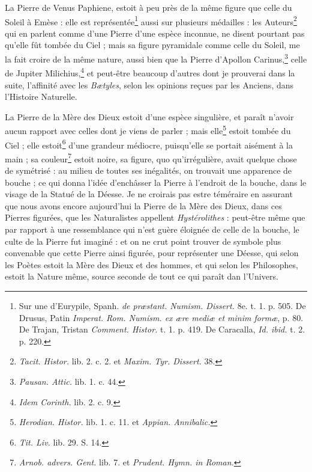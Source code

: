 \documentclass[a4paper, 11pt, oneside, polutonikogreek, french]{article}
\begin{document}
La Pierre de Venus Paphiene, estoit à peu près de la même figure que celle du Soleil à Emèse : elle est représentée\footnote{Sur une d'Eurypile, Spanh. \emph{de præstant. Numism. Dissert.} 8e. t. 1. p. 505. De Drusus, Patin \emph{Imperat. Rom. Numism. ex ære mediæ et minim formæ}, p. 80. De Trajan, Tristan \emph{Comment. Histor.} t. 1. p. 419. De Caracalla, \emph{Id. ibid.} t. 2. p. 220.} aussi sur plusieurs médailles : les Auteurs\footnote{\emph{Tacit. Histor.} lib. 2. c. 2. et \emph{Maxim. Tyr. Dissert.} 38.} qui en parlent comme d'une Pierre d'une espèce inconnue, ne disent pourtant pas qu'elle fût tombée du Ciel ; mais sa figure pyramidale comme celle du Soleil, me la fait croire de la même nature, aussi bien que la Pierre d'Apollon Carinus,\footnote{\emph{Pausan. Attic.} lib. 1. c. 44.} celle de Jupiter Milichius,\footnote{\emph{Idem Corinth.} lib. 2. c. 9.} et peut-être beaucoup d'autres dont je prouverai dans la suite, l'affinité avec les \emph{Bætyles}, selon les opinions reçues par les Anciens, dans l'Histoire Naturelle.

La Pierre de la Mère des Dieux estoit d'une espèce singulière, et paraît n'avoir aucun rapport avec celles dont je viens de parler ; mais elle\footnote{\emph{Herodian. Histor.} lib. 1. c. 11. et \emph{Appian. Annibalic.}} estoit tombée du Ciel ; elle estoit\footnote{\emph{Tit. Liv.} lib. 29. S. 14.} d'une grandeur médiocre, puisqu'elle se portait aisément à la main ; sa couleur\footnote{\emph{Arnob. advers. Gent.} lib. 7. et \emph{Prudent. Hymn. in Roman.}} estoit noire, sa figure, quo qu’irrégulière, avait quelque chose de symétrisé : au milieu de toutes ses inégalités, on trouvait une apparence de bouche ; ce qui donna l'idée d'enchâsser la Pierre à l'endroit de la bouche, dans le visage de la Statué de la Déesse. Je ne croirais pas estre téméraire en assurant que nous avons encore aujourd’hui la Pierre de la Mère des Dieux, dans ces Pierres figurées, que les Naturalistes appellent \emph{Hystérolithes} : peut-être même que par rapport à une ressemblance qui n'est guère éloignée de celle de la bouche, le culte de la Pierre fut imaginé : et on ne crut point trouver de symbole plus convenable que cette Pierre ainsi figurée, pour représenter une Déesse, qui selon les Poètes estoit la Mère des Dieux et des hommes, et qui selon les Philosophes, estoit la Nature même, source seconde de tout ce qui paraît dan l'Univers.
\end{document}
